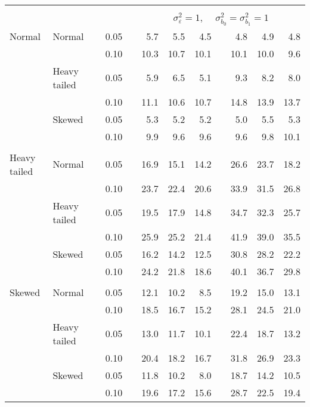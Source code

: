 \begin{table}[ht]
\begin{scriptsize}
\begin{tabular}{ll p{.1cm} c p{.1cm} rrr p{.1cm} rrr}
&&&&&&&&&&&\\
& && && \multicolumn{7}{c}{$\sigma_{\varepsilon}^2 = 1$, \ \ $\sigma_{b_0}^2 = \sigma_{b_1}^2 = 1$} \\ \cline{6-12}
\rowcolor{gray!20} Normal & Normal &  & 0.05 &  & 5.7 & 5.5 & 4.5 &  & 4.8 & 4.9 & 4.8 \\ 
\rowcolor{gray!20}    &  &  & 0.10 &  & 10.3 & 10.7 & 10.1 &  & 10.1 & 10.0 & 9.6 \\ 
\rowcolor{gray!20}    & Heavy tailed &  & 0.05 &  & 5.9 & 6.5 & 5.1 &  & 9.3 & 8.2 & 8.0 \\ 
\rowcolor{gray!20}    &  &  & 0.10 &  & 11.1 & 10.6 & 10.7 &  & 14.8 & 13.9 & 13.7 \\ 
\rowcolor{gray!20}    & Skewed &  & 0.05 &  & 5.3 & 5.2 & 5.2 &  & 5.0 & 5.5 & 5.3 \\ 
\rowcolor{gray!20}    &  &  & 0.10 &  & 9.9 & 9.6 & 9.6 &  & 9.6 & 9.8 & 10.1 \\ 
&&&&&&&&&&&\\
  Heavy tailed & Normal &  & 0.05 &  & 16.9 & 15.1 & 14.2 &  & 26.6 & 23.7 & 18.2 \\ 
  &  &  & 0.10 &  & 23.7 & 22.4 & 20.6 &  & 33.9 & 31.5 & 26.8 \\ 
  & Heavy tailed &  & 0.05 &  & 19.5 & 17.9 & 14.8 &  & 34.7 & 32.3 & 25.7 \\ 
  &  &  & 0.10 &  & 25.9 & 25.2 & 21.4 &  & 41.9 & 39.0 & 35.5 \\ 
  & Skewed &  & 0.05 &  & 16.2 & 14.2 & 12.5 &  & 30.8 & 28.2 & 22.2 \\ 
  &  &  & 0.10 &  & 24.2 & 21.8 & 18.6 &  & 40.1 & 36.7 & 29.8 \\ 
&&&&&&&&&&&\\
  Skewed & Normal &  & 0.05 &  & 12.1 & 10.2 & 8.5 &  & 19.2 & 15.0 & 13.1 \\ 
   &  &  & 0.10 &  & 18.5 & 16.7 & 15.2 &  & 28.1 & 24.5 & 21.0 \\ 
   & Heavy tailed &  & 0.05 &  & 13.0 & 11.7 & 10.1 &  & 22.4 & 18.7 & 13.2 \\ 
   &  &  & 0.10 &  & 20.4 & 18.2 & 16.7 &  & 31.8 & 26.9 & 23.3 \\ 
   & Skewed &  & 0.05 &  & 11.8 & 10.2 & 8.0 &  & 18.7 & 14.2 & 10.5 \\ 
   &  &  & 0.10 &  & 19.6 & 17.2 & 15.6 &  & 28.7 & 22.5 & 19.4 \\ 


\end{tabular}
\end{scriptsize}
\end{table}
